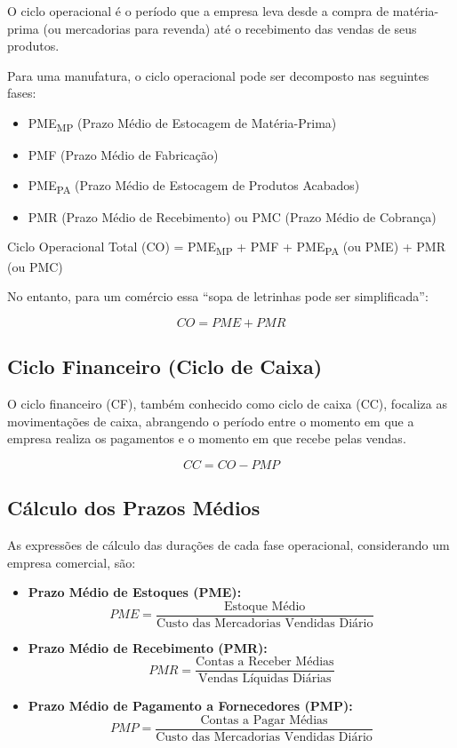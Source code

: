 \documentclass[
  a4paper,
]{book}
\providecommand{\tightlist}{%
  \setlength{\itemsep}{0pt}\setlength{\parskip}{0pt}}\usepackage{longtable,booktabs,array}
\begin{document}
O ciclo operacional é o período que a empresa leva desde a compra de
matéria-prima (ou mercadorias para revenda) até o recebimento das vendas
de seus produtos.

Para uma manufatura, o ciclo operacional pode ser decomposto nas
seguintes fases:

\begin{itemize}
\tightlist
\item
  PME\textsubscript{MP} (Prazo Médio de Estocagem de Matéria-Prima)
\item
  PMF (Prazo Médio de Fabricação)
\item
  PME\textsubscript{PA} (Prazo Médio de Estocagem de Produtos Acabados)
\item
  PMR (Prazo Médio de Recebimento) ou PMC (Prazo Médio de Cobrança)
\end{itemize}

Ciclo Operacional Total (CO) = PME\textsubscript{MP} + PMF +
PME\textsubscript{PA} (ou PME) + PMR (ou PMC)

No entanto, para um comércio essa ``sopa de letrinhas pode ser
simplificada'':

\[CO = PME + PMR\]

\subsection{Ciclo Financeiro (Ciclo de
Caixa)}\label{ciclo-financeiro-ciclo-de-caixa}

O ciclo financeiro (CF), também conhecido como ciclo de caixa (CC),
focaliza as movimentações de caixa, abrangendo o período entre o momento
em que a empresa realiza os pagamentos e o momento em que recebe pelas
vendas.

\[CC = CO - PMP\]

\subsection{Cálculo dos Prazos
Médios}\label{cuxe1lculo-dos-prazos-muxe9dios}

As expressões de cálculo das durações de cada fase operacional,
considerando um empresa comercial, são:

\begin{itemize}
\tightlist
\item
  \textbf{Prazo Médio de Estoques (PME):}
  \[PME = \frac{\text{Estoque Médio}}{\text{Custo das Mercadorias Vendidas Diário}}\]
\item
  \textbf{Prazo Médio de Recebimento (PMR):}
  \[PMR = \frac{\text{Contas a Receber Médias}}{\text{Vendas Líquidas Diárias}}\]
\item
  \textbf{Prazo Médio de Pagamento a Fornecedores (PMP):}
  \[PMP = \frac{\text{Contas a Pagar Médias}}{\text{Custo das Mercadorias Vendidas Diário}}\]
\end{itemize}
\end{document}
